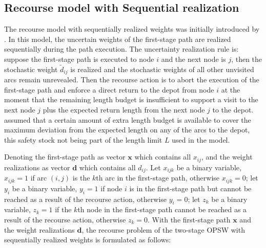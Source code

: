 \documentclass[preprint,review,10pt,round,authoryear]{elsarticle}\usepackage[]{graphicx}\usepackage[]{color}
\theoremstyle{plain}
\theoremstyle{definition}
\theoremstyle{remark}
\begin{document}
\subsection{Recourse model with Sequential realization}

The recourse model with sequentially realized weights was initially introduced by \cite{evers2014two}. In this model, the uncertain weights of the first-stage path are realized sequentially during the path execution. The uncertainty realization rule is: suppose the first-stage path is executed to node $i$ and the next node is $j$, then the stochastic weight $\tilde{d}_{ij}$ is realized and the stochastic weights of all other unvisited arcs remain unrevealed. Then the recourse action is to abort the execution of the first-stage path and enforce a direct return to the depot from node $i$ at the moment that the remaining length budget is insufficient to support a visit to the next node $j$ plus the expected return length from the next node $j$ to the depot. \cite{evers2014two} assumed that a certain amount of extra length budget is available to cover the maximum deviation from the expected length on any of the arcs to the depot, this safety stock not being part of the length limit $L$ used in the model.


Denoting the first-stage path as vector $\mathbf{x}$ which contains all $x_{ij}$, and the weight realizations as vector $\mathbf{d}$ which contains all $d_{ij}$. Let $x_{ijk}$ be a binary variable, $x_{ijk}=1$ if arc $(i,j)$ is the $k$th arc in the first-stage path, otherwise $x_{ijk}=0$; let $y_i$ be a binary variable, $y_i=1$ if node $i$ is in the first-stage path but cannot be reached as a result of the recourse action, otherwise $y_i=0$; let $z_k$ be a binary variable, $z_k=1$ if the $k$th node in the first-stage path cannot be reached as a result of the recourse action, otherwise $z_k=0$. With the first-stage path $\mathbf{x}$ and the weight realizations $\mathbf{d}$, the recourse problem of the two-stage OPSW with sequentially realized weights is formulated as follows:
\end{document}
